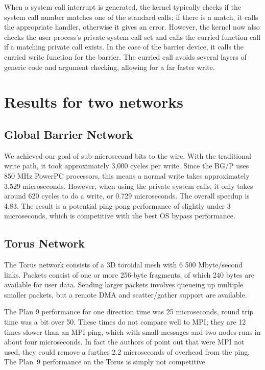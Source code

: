 \documentclass[a4,10pt,preprint]{sigplanconf}
\begin{document}
When a system call interrupt is generated, the kernel typically checks
if the system call number matches one of the standard calls; if there
is a match, it calls the appropriate handler, otherwise it gives an
error. However, the kernel now also checks the user process's private
system call set and calls the curried function call if a matching
private call exists. In the case of the barrier device, it calls the
curried write function for the barrier. The curried call avoids several
layers of generic code and argument checking, allowing for a far
faster write.

\section{Results for two networks}
\subsection{Global Barrier Network}
We achieved our goal of sub-microsecond bits to the wire. With the traditional write path, it took approximately 3,000 cycles per write. Since the BG/P uses 850 MHz PowerPC processors, this means a normal write takes approximately 3.529 microseconds. However, when using the private system calls, it only takes around 620 cycles to do a write, or 0.729 microseconds. The overall speedup is 4.83. 
The result is a potential ping-pong performance of slightly under 3 microseconds, which is competitive with the best OS bypass performance. 

\subsection{Torus Network}
The Torus network consists of a 3D toroidal mesh with 6 500 Mbyte/second links. Packets consist of one or more 
256-byte fragments, of which 240 bytes are available for user data. Sending larger packets involves queueing up multiple smaller packets, but a remote DMA and scatter/gather support are available. 

The Plan 9 performance for one direction time was 25 microseconds, round trip time was a bit over 50. These times do not compare well to MPI; they are 12 times slower than an MPI ping\cite{1375544}, which with small messages and two nodes runs in about four microseconds. In fact the authors of \cite{1375544} point out that were MPI not used, they could remove a further 2.2 microseconds of overhead from the ping. The Plan~9 performance on the Torus is simply not competitive. 
\end{document}
